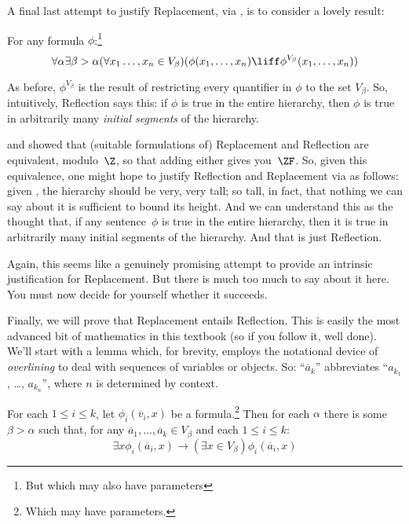 \documentclass[../../../include/open-logic-section]{subfiles}
\begin{document}

A final last attempt to justify Replacement, via \stagesinex, is to
consider a lovely result:
\begin{thm}
For any formula $\phi$:\footnote{But which may also have parameters}
\[
\forall \alpha \exists \beta > \alpha (\forall x_1 \ldots, x_n \in
V_\beta)(\phi(x_1, \ldots, x_n) \liff \phi^{V_\beta}(x_1, \ldots, x_n))
\]
\end{thm}

As before, $\phi^{V_\beta}$ is the result of restricting every
quantifier in $\phi$ to the set $V_\beta$. So, intuitively, Reflection
says this: if $\phi$ is true in the entire hierarchy, then $\phi$ is
true in arbitrarily many \emph{initial segments} of the hierarchy. 

\citet{Montague1961} and \citet{Levy1960} showed that (suitable
formulations of) Replacement and Reflection are equivalent,
modulo~$\Z$, so that adding either gives you~$\ZF$. So, given this
equivalence, one might hope to justify Reflection  and Replacement via
\stagesinex{} as follows: given \stagesinex, the hierarchy should be
very, very tall; so tall, in fact, that nothing we can say about it is
sufficient to bound its height. And we can understand this as the
thought that, if any sentence~$\phi$ is true in the entire hierarchy,
then it is true in arbitrarily many initial segments of the hierarchy.
And that is just Reflection. 

Again, this seems like a genuinely promising attempt to provide an
intrinsic justification for Replacement. But there is much too much to
say about it here. You must now decide for yourself whether it
succeeds.

Finally, we will prove that Replacement entails
Reflection. This is easily the most advanced bit of mathematics in
this textbook (so if you follow it, well done). We'll start with a
lemma which, for brevity, employs the notational device of
\emph{overlining} to deal with sequences of variables or objects. So:
``$\overline{a}_k$'' abbreviates ``$a_{k_1}$, \dots, $a_{k_n}$'', where
$n$ is determined by context.

\begin{lem}
For each $1 \leq i \leq k$, let $\phi_i(\overline{v}_i, x)$ be a
formula.\footnote{Which may have parameters.} Then for each $\alpha$
there is some $\beta > \alpha$ such that, for any $\overline{a}_1,
\ldots, \overline{a}_k \in V_\beta$ and each $1 \leq i \leq k$:
\[
	\exists x\phi_i(\overline{a}_i, x) \rightarrow (\exists x \in V_\beta) \phi_i(\overline{a}_i, x)
\]
\end{lem}
\end{document}
